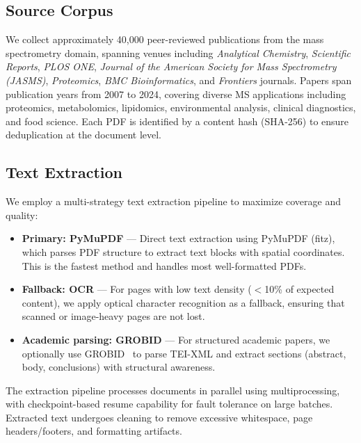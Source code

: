 \documentclass[11pt]{article}
\begin{document}
\subsection{Source Corpus}
\label{sec:source_corpus}

We collect approximately 40,000 peer-reviewed publications from the mass spectrometry domain, spanning venues including \textit{Analytical Chemistry}, \textit{Scientific Reports}, \textit{PLOS ONE}, \textit{Journal of the American Society for Mass Spectrometry (JASMS)}, \textit{Proteomics}, \textit{BMC Bioinformatics}, and \textit{Frontiers} journals. Papers span publication years from 2007 to 2024, covering diverse MS applications including proteomics, metabolomics, lipidomics, environmental analysis, clinical diagnostics, and food science. Each PDF is identified by a content hash (SHA-256) to ensure deduplication at the document level.

\subsection{Text Extraction}
\label{sec:extraction}

We employ a multi-strategy text extraction pipeline to maximize coverage and quality:

\begin{itemize}[leftmargin=*,itemsep=1pt]
    \item \textbf{Primary: PyMuPDF} --- Direct text extraction using PyMuPDF (fitz), which parses PDF structure to extract text blocks with spatial coordinates. This is the fastest method and handles most well-formatted PDFs.

    \item \textbf{Fallback: OCR} --- For pages with low text density ($<$10\% of expected content), we apply optical character recognition as a fallback, ensuring that scanned or image-heavy pages are not lost.

    \item \textbf{Academic parsing: GROBID} --- For structured academic papers, we optionally use GROBID~\citep{lopez2009grobid} to parse TEI-XML and extract sections (abstract, body, conclusions) with structural awareness.
\end{itemize}

The extraction pipeline processes documents in parallel using multiprocessing, with checkpoint-based resume capability for fault tolerance on large batches. Extracted text undergoes cleaning to remove excessive whitespace, page headers/footers, and formatting artifacts.
\end{document}
